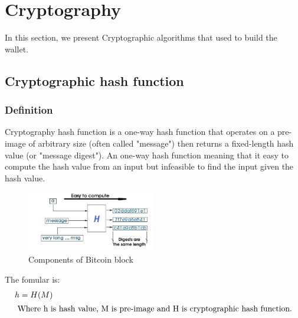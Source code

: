 \section{Cryptography}
In this section, we present Cryptographic algorithms that used to build the wallet.

\subsection{Cryptographic hash function}
\label{sec:crypto_hash}
\subsubsection{Definition}
Cryptography hash function is a one-way hash function that operates on a pre-image of arbitrary size (often called "message") then returns a fixed-length hash value (or "message digest").
An one-way hash function meaning that it easy to compute the hash value from an input but infeasible to find the input given the hash value.
\begin{figure}[h!]
	\centering
	\includegraphics[width=0.5\textwidth]{images/hash_function.png}
	\caption[Components of Bitcoin block]{Components of Bitcoin block}
	\label{fig:hash_function}
\end{figure}

The fomular is:
\begin{align*}
	h & = H(M) \\ \intertext{ Where h is hash value, M is pre-image and H is cryptographic hash function.}
\end{align*}


